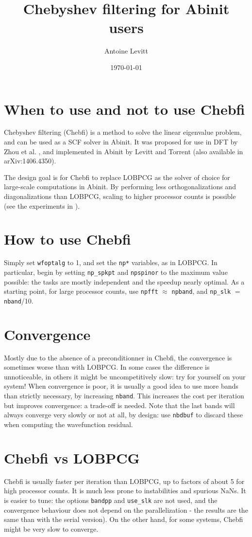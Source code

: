 \documentclass[11pt]{article}
\title{Chebyshev filtering for Abinit users}
\author{Antoine Levitt}
\date{\today}
\begin{document}
\maketitle
\tableofcontents
\section{When to use and not to use Chebfi}
Chebyshev filtering (Chebfi) is a method to solve the linear
eigenvalue problem, and can be used as a SCF solver in Abinit. It was
proposed for use in DFT by Zhou et al. \cite{zhou2006self}, and
implemented in Abinit by Levitt and Torrent \cite{levitt2014parallel} 
(also available in arXiv:1406.4350).

The design goal is for Chebfi to replace LOBPCG as the solver of
choice for large-scale computations in Abinit. By performing less
orthogonalizations and diagonalizations than LOBPCG, scaling to higher
processor counts is possible (see the experiments in
\cite{levitt2014parallel}).

\section{How to use Chebfi}
Simply set \texttt{wfoptalg} to 1, and set the \texttt{np*} variables,
as in LOBPCG. In particular, begin by setting \texttt{np_spkpt} and
\texttt{npspinor} to the maximum value possible: the tasks are mostly
independent and the speedup nearly optimal. As a starting point, for
large processor counts, use \texttt{npfft} $\approx$ \texttt{npband},
and \texttt{np\_slk} $=$ \texttt{nband}/10.
\section{Convergence}
Mostly due to the absence of a preconditionner in Chebfi, the
convergence is sometimes worse than with LOBPCG. In some cases the
difference is unnoticeable, in others it might be uncompetitively
slow: try for yourself on your system! When convergence is poor, it is
usually a good idea to use more bands than strictly necessary, by
increasing \texttt{nband}. This increases the cost per iteration but
improves convergence: a trade-off is needed. Note that the last bands
will always converge very slowly or not at all, by design: use
\texttt{nbdbuf} to discard these when computing the wavefunction
residual.
\section{Chebfi vs LOBPCG}
Chebfi is usually faster per iteration than LOBPCG, up to factors of
about 5 for high processor counts. It is much less prone to
instabilities and spurious NaNs. It is easier to tune: the options
\texttt{bandpp} and \texttt{use\_slk} are not used, and the
convergence behaviour does not depend on the parallelization - the
results are the same than with the serial version). On the other hand,
for some systems, Chebfi might be very slow to converge.
\end{document}

